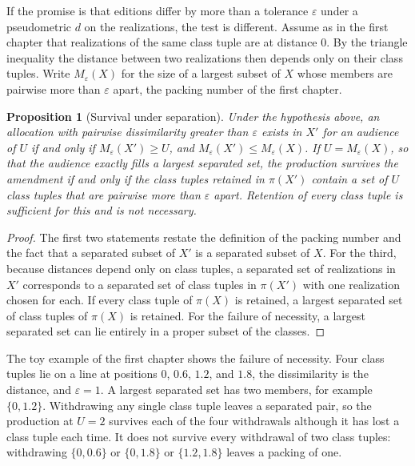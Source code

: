 \documentclass[11pt,twoside,openright]{book}
\theoremstyle{plain}
\newtheorem{proposition}[theorem]{Proposition}
\theoremstyle{definition}
\theoremstyle{remark}
\begin{document}
If the promise is that editions differ by more than a tolerance $\varepsilon$ under a pseudometric $d$ on the realizations, the test is different. Assume as in the first chapter that realizations of the same class tuple are at distance $0$. By the triangle inequality the distance between two realizations then depends only on their class tuples. Write $M_\varepsilon(X)$ for the size of a largest subset of $X$ whose members are pairwise more than $\varepsilon$ apart, the packing number of the first chapter.

\begin{proposition}[Survival under separation]\label{prop:sepsurvive}
Under the hypothesis above, an allocation with pairwise dissimilarity greater than $\varepsilon$ exists in $X'$ for an audience of $U$ if and only if $M_\varepsilon(X')\ge U$, and $M_\varepsilon(X')\le M_\varepsilon(X)$. If $U=M_\varepsilon(X)$, so that the audience exactly fills a largest separated set, the production survives the amendment if and only if the class tuples retained in $\pi(X')$ contain a set of $U$ class tuples that are pairwise more than $\varepsilon$ apart. Retention of every class tuple is sufficient for this and is not necessary.
\end{proposition}

\begin{proof}
The first two statements restate the definition of the packing number and the fact that a separated subset of $X'$ is a separated subset of $X$. For the third, because distances depend only on class tuples, a separated set of realizations in $X'$ corresponds to a separated set of class tuples in $\pi(X')$ with one realization chosen for each. If every class tuple of $\pi(X)$ is retained, a largest separated set of class tuples of $\pi(X)$ is retained. For the failure of necessity, a largest separated set can lie entirely in a proper subset of the classes.
\end{proof}

The toy example of the first chapter shows the failure of necessity. Four class tuples lie on a line at positions $0$, $0.6$, $1.2$, and $1.8$, the dissimilarity is the distance, and $\varepsilon=1$. A largest separated set has two members, for example $\{0,1.2\}$. Withdrawing any single class tuple leaves a separated pair, so the production at $U=2$ survives each of the four withdrawals although it has lost a class tuple each time. It does not survive every withdrawal of two class tuples: withdrawing $\{0,0.6\}$ or $\{0,1.8\}$ or $\{1.2,1.8\}$ leaves a packing of one.
\end{document}
